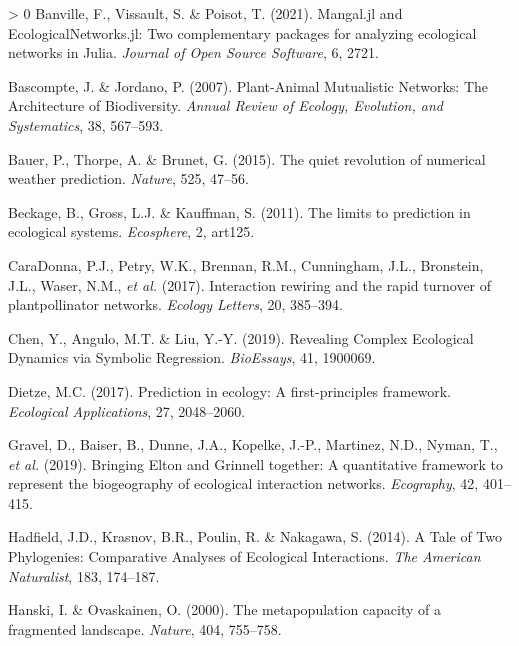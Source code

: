 \documentclass[10pt,oneside]{article}
\newlength{\cslhangindent}
\newenvironment{CSLReferences}[3] %
 {%
  \setlength{\parindent}{0pt}
  \ifodd #1 \everypar{\setlength{\hangindent}{\cslhangindent}}\ignorespaces\fi
  \ifnum #2 > 0
  \setlength{\parskip}{#2\baselineskip}
  \fi
 }%
 {}
\begin{document}
\hypertarget{refs}{}
\begin{CSLReferences}{1}{0}
\leavevmode\hypertarget{ref-Banville2021ManJl}{}%
Banville, F., Vissault, S. \& Poisot, T. (2021). Mangal.jl and
EcologicalNetworks.jl: Two complementary packages for analyzing
ecological networks in Julia. \emph{Journal of Open Source Software}, 6,
2721.

\leavevmode\hypertarget{ref-Bascompte2007PlaMut}{}%
Bascompte, J. \& Jordano, P. (2007). Plant-Animal Mutualistic Networks:
The Architecture of Biodiversity. \emph{Annual Review of Ecology,
Evolution, and Systematics}, 38, 567--593.

\leavevmode\hypertarget{ref-Bauer2015QuiRev}{}%
Bauer, P., Thorpe, A. \& Brunet, G. (2015). The quiet revolution of
numerical weather prediction. \emph{Nature}, 525, 47--56.

\leavevmode\hypertarget{ref-Beckage2011LimPre}{}%
Beckage, B., Gross, L.J. \& Kauffman, S. (2011). The limits to
prediction in ecological systems. \emph{Ecosphere}, 2, art125.

\leavevmode\hypertarget{ref-CaraDonna2017IntRew}{}%
CaraDonna, P.J., Petry, W.K., Brennan, R.M., Cunningham, J.L.,
Bronstein, J.L., Waser, N.M., \emph{et al.} (2017). Interaction rewiring
and the rapid turnover of plantpollinator networks. \emph{Ecology
Letters}, 20, 385--394.

\leavevmode\hypertarget{ref-Chen2019RevCom}{}%
Chen, Y., Angulo, M.T. \& Liu, Y.-Y. (2019). Revealing Complex
Ecological Dynamics via Symbolic Regression. \emph{BioEssays}, 41,
1900069.

\leavevmode\hypertarget{ref-Dietze2017PreEco}{}%
Dietze, M.C. (2017). Prediction in ecology: A first-principles
framework. \emph{Ecological Applications}, 27, 2048--2060.

\leavevmode\hypertarget{ref-Gravel2019BriElt}{}%
Gravel, D., Baiser, B., Dunne, J.A., Kopelke, J.-P., Martinez, N.D.,
Nyman, T., \emph{et al.} (2019). Bringing Elton and Grinnell together: A
quantitative framework to represent the biogeography of ecological
interaction networks. \emph{Ecography}, 42, 401--415.

\leavevmode\hypertarget{ref-Hadfield2014TalTwo}{}%
Hadfield, J.D., Krasnov, B.R., Poulin, R. \& Nakagawa, S. (2014). A Tale
of Two Phylogenies: Comparative Analyses of Ecological Interactions.
\emph{The American Naturalist}, 183, 174--187.

\leavevmode\hypertarget{ref-Hanski2000MetCap}{}%
Hanski, I. \& Ovaskainen, O. (2000). The metapopulation capacity of a
fragmented landscape. \emph{Nature}, 404, 755--758.


\end{CSLReferences}
\end{document}
